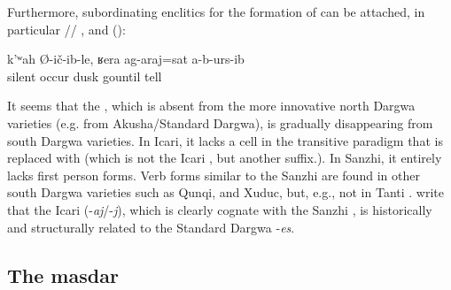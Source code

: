 Furthermore, subordinating enclitics for the formation of  can be attached, in particular \slash{}\slash{}  ,   and   ():
%
\begin{exe}
	\ex	\label{ex:‎‎‎He remained silent, until it became dark he did not tell}
	\gll	k'ʷah	Ø-ič-ib-le,	ʁera	ag-araj=sat	a-b-urs-ib\\
		silent	occur	dusk	gountil	tell\\
	\glt	{}
\end{exe}

It seems that the , which is absent from the more innovative north Dargwa varieties (e.g. from Akusha\slash Standard Dargwa), is gradually disappearing from south Dargwa varieties. In Icari, it lacks a cell in the transitive paradigm that is replaced with  (which is not the Icari , but another suffix.). In Sanzhi, it entirely lacks first person forms. Verb forms similar to the Sanzhi  are found in other south Dargwa varieties such as Qunqi, and Xuduc, but, e.g., not in Tanti \citep[136]{Sumbatova.Lander2014}. \citet[107]{Sumbatova.Mutalov2003} write that the Icari  (-\textit{aj}\slash -\textit{j}), which is clearly cognate with the Sanzhi , is historically and structurally related to the Standard Dargwa  -\textit{es}. 





\subsection{The masdar}
\label{ssec:The masdar}

